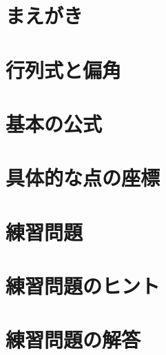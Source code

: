 \documentclass[dvipdfmx]{jsarticle}
\begin{document}
\maketitle
\tableofcontents
\clearpage
\section*{まえがき}

%
\newpage
\section{行列式と偏角}

%
\newpage
\section{基本の公式}

%
\newpage
\section{具体的な点の座標}

%
\newpage
\section{練習問題}

%
\newpage
\section{練習問題のヒント}

%
\newpage
\section{練習問題の解答}

%
\newpage

\nocite{*}

\end{document}
